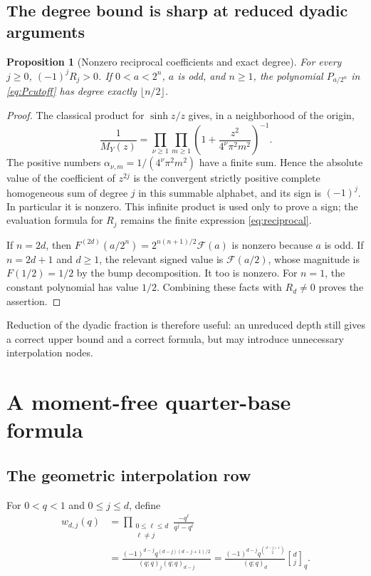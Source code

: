 \documentclass[11pt,oneside]{article}
\newtheorem{proposition}[theorem]{Proposition}
\theoremstyle{definition}\newtheorem{definition}[theorem]{Definition}
\theoremstyle{remark}\newtheorem{remark}[theorem]{Remark}
\newcommand{\G}{\mathcal F}\newcommand{\eps}{\varepsilon}
\newcommand{\qbinom}[3]{\genfrac{[}{]}{0pt}{}{#1}{#2}_{#3}}
\begin{document}
\subsection{The degree bound is sharp at reduced dyadic arguments}
\begin{proposition}[Nonzero reciprocal coefficients and exact degree]
\label{prop:exactdegree}
For every $j\ge0$, $(-1)^jR_j>0$. If $0<a<2^n$, $a$ is odd, and
$n\ge1$, the polynomial $P_{a/2^n}$ in \eqref{eq:Pcutoff} has degree
exactly $\lfloor n/2\rfloor$.
\end{proposition}
\begin{proof}
The classical product for $\sinh z/z$ \cite[\S4.36]{dlmfSinh} gives,
in a neighborhood of the origin,
\begin{equation}
 \frac1{M_Y(z)}=
 \prod_{\nu\ge1}\prod_{m\ge1}
 \left(1+\frac{z^2}{4^\nu\pi^2m^2}\right)^{-1}.
 \label{eq:reciprocalproduct}
\end{equation}
The positive numbers $\alpha_{\nu,m}=1/(4^\nu\pi^2m^2)$ have a finite
sum. Hence the absolute value of the coefficient of $z^{2j}$ is the convergent
strictly positive complete homogeneous sum of degree $j$ in this summable alphabet,
and its sign is $(-1)^j$. In particular it is nonzero. This infinite product
is used only to prove a sign; the evaluation formula for $R_j$ remains the
finite expression \eqref{eq:reciprocal}.

If $n=2d$, then
$F^{(2d)}(a/2^n)=2^{n(n+1)/2}\G(a)$ is nonzero because $a$ is odd.
If $n=2d+1$ and $d\ge1$, the relevant signed value is $\G(a/2)$, whose
magnitude is $F(1/2)=1/2$ by the bump decomposition. It too is nonzero.
For $n=1$, the constant polynomial has value $1/2$. Combining these facts
with $R_d\ne0$ proves the assertion.
\end{proof}

Reduction of the dyadic fraction is therefore useful: an unreduced depth
still gives a correct upper bound and a correct formula, but may introduce
unnecessary interpolation nodes.

\section{A moment-free quarter-base formula}
\label{sec:quarter}

\subsection{The geometric interpolation row}
For $0<q<1$ and $0\le j\le d$, define
\begin{align}
 w_{d,j}(q)
 &=\prod_{\substack{0\le\ell\le d\\\ell\ne j}}
        \frac{-q^\ell}{q^j-q^\ell}
 \label{eq:weightsproduct}\\
 &=\frac{(-1)^{d-j}q^{(d-j)(d-j+1)/2}}
        {(q;q)_j(q;q)_{d-j}}
 =\frac{(-1)^{d-j}q^{\binom{d-j+1}{2}}}{(q;q)_d}
       \qbinom{d}{j}{q}.
 \label{eq:weightsq}
\end{align}
\end{document}

